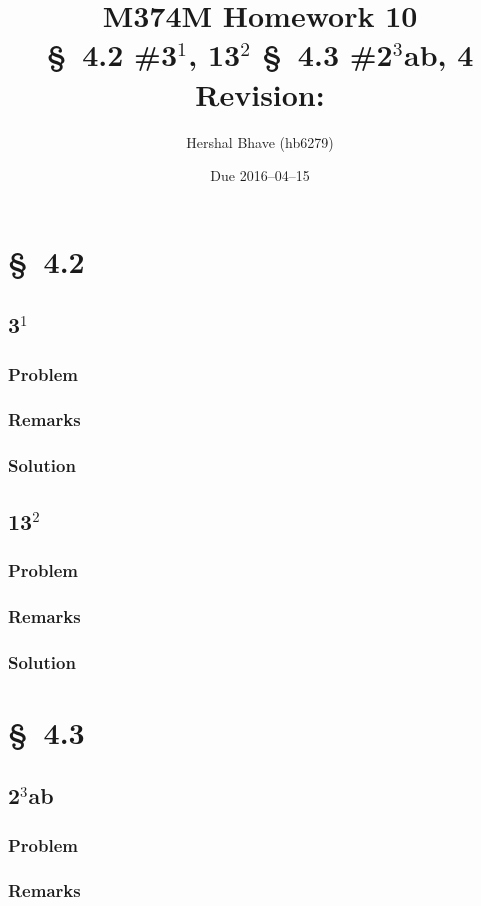\documentclass[12pt,twoside]{article}
\title{M374M Homework 10 \\
  \normalsize{\S~4.2 \#3$^1$, 13$^2$ \S~4.3 \#2$^3$ab, 4} \\
  Revision: }
\author{Hershal Bhave (hb6279)}
\date{Due 2016--04--15}
\begin{document}
\maketitle

\section{\S~4.2}
\subsection{3$^1$}
\subsubsection*{Problem}
\subsubsection*{Remarks}
\subsubsection*{Solution}

\subsection{13$^2$}
\subsubsection*{Problem}
\subsubsection*{Remarks}
\subsubsection*{Solution}

\section{\S~4.3}
\subsection{2$^3$ab}
\subsubsection*{Problem}
\subsubsection*{Remarks}
\end{document}
